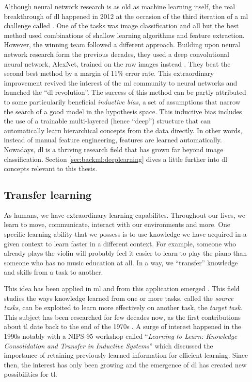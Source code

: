 Although neural network research is as old as machine learning itself, the real breakthrough of \acrlong{dl} happened in 2012 at the occasion of the third iteration of a \acrlong{ml} challenge called  \parencite{russakovsky2015imagenet}. One of the tasks was image classification and all but the best method used combinations of shallow learning algorithms and feature extraction. However, the winning team followed a different approach. Building upon neural network research form the previous decades, they used a deep convolutional neural network, AlexNet, trained on the raw images instead \parencite{krizhevsky2012imagenet}. They beat the second best method by a margin of 11\% error rate. This extraordinary improvement revived the interest of the \acrlong{ml} community to neural networks and launched the ``\acrlong{dl} revolution''. The success of this method can be partly attributed to some particularily beneficial \textit{inductive bias}, a set of assumptions that narrow the search of a good model in the hypothesis space. This inductive bias includes the use of a trainable multi-layered (hence ``deep'') structure that can automatically learn hierarchical concepts from the data directly. In other words, instead of manual feature engineering, features are learned automatically. Nowadays, \acrlong{dl} is a thriving research field that has grown far beyond image classification. Section \ref{sec:backml:deeplearning} dives a little further into \acrlong{dl} concepts relevant to this thesis.

\subsection{Transfer learning}
\label{ssec:backml:transfer}

As humans, we have extraordinary learning capabilites. Throughout our lives, we learn to move, communicate, interact with our environments and more. One specific learning ability that we possess is to use knowledge we have acquired in a given context to learn faster in a different context. For example, someone who already plays the violin will probably feel it easier to learn to play the piano than someone who has no music education at all. In a way, we ``transfer'' knowledge and skills from a task to another. 

This idea has been applied in \acrlong{ml} and from this application emerged  \parencite{yang2020transfer}. This field studies the ways knowledge learned from one or more tasks, called the \textit{source tasks}, can be exploited to learn more effectively on another task, the \textit{target task}. This subject has been researched for few decades now, as the first contributions about \acrlong{tl} date back to the end of the 1970s \parencite{bozinovski2020reminder}. A surge of interest happened in the 1990s notably with a NIPS-95 workshop called ``\textit{Learning to Learn: Knowledge Consolidation and Transfer in Inductive Systems}'' which discussed the importance of retaining previously-learned information for efficient learning. Since then, the interest has only been growing and the emergence of \acrlong{dl} has created new possibilities for \acrlong{tl}. 

